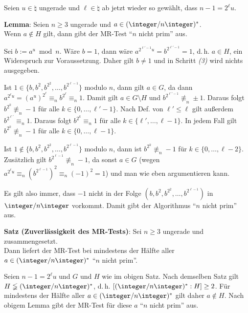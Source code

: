 \linie

Seien $u \in \natural$ ungerade und
$\ell \in \natural$ ab jetzt wieder so gewählt, dass $n-1 = 2^\ell u$.

\textbf{Lemma}:
Seien $n \ge 3$ ungerade und $a \in (\ZnZ)^\ast$.\\
Wenn $a \notin H$ gilt, dann gibt der MR-Test "`$n$ nicht prim"' aus.

\begin{Beweis}
    Sei $b := a^u \bmod n$.
    Wäre $b = 1$, dann wäre $a^{2^{\ell'-1} u} = b^{2^{\ell'-1}} = 1$,
    d.\,h. $a \in H$, ein Widerspruch zur Voraussetzung.
    Daher gilt $b \not= 1$ und in Schritt \emph{(3)} wird nichts ausgegeben.
    
    Ist $1 \in \{b, b^2, b^{2^2}, \dotsc, b^{2^{\ell-1}}\}$ modulo $n$,
    dann gilt $a \in G$,
    da dann $a^{2^\ell u} = (a^u)^{2^\ell} \equiv_n b^{2^\ell} \equiv_n 1$.
    Damit gilt $a \in G \setminus H$ und
    $b^{2^{\ell'-1}} \not\equiv_n \pm 1$.
    Daraus folgt $b^{2^k} \not\equiv_n -1$ für alle $k \in \{0, \dotsc, \ell' - 1\}$.
    Nach Def. von $\ell' \le \ell$ gilt außerdem $b^{2^{\ell'}} \equiv_n 1$.
    Daraus folgt $b^{2^k} \equiv_n 1$ für alle $k \in \{\ell', \dotsc, \ell - 1\}$.
    In jedem Fall gilt $b^{2^k} \not\equiv_n -1$ für alle $k \in \{0, \dotsc, \ell - 1\}$.
    
    Ist $1 \notin \{b, b^2, b^{2^2}, \dotsc, b^{2^{\ell-1}}\}$ modulo $n$,
    dann ist $b^{2^k} \not\equiv_n -1$ für $k \in \{0, \dotsc, \ell-2\}$.
    Zusätzlich gilt $b^{2^{\ell-1}} \not\equiv_n -1$,
    da sonst $a \in G$
    (wegen $a^{2^\ell u} \equiv_n (b^{2^{\ell-1}})^2 \equiv_n (-1)^2 = 1$)
    und man wie eben argumentieren kann.
    
    Es gilt also immer, dass $-1$ nicht in der Folge $(b, b^2, b^{2^2}, \dotsc, b^{2^{\ell-1}})$
    in $\ZnZ$ vorkommt.
    Damit gibt der Algorithmus "`$n$ nicht prim"' aus.
\end{Beweis}

\linie

\textbf{Satz (Zuverlässigkeit des MR-Tests)}:
Sei $n \ge 3$ ungerade und zusammengesetzt.\\
Dann liefert der MR-Test bei mindestens der Hälfte aller $a \in (\ZnZ)^\ast$
"`$n$ nicht prim"'.

\begin{Beweis}
    Seien $n-1 = 2^\ell u$ und $G$ und $H$ wie im obigen Satz.
    Nach demselben Satz gilt $H \lneqq (\ZnZ)^\ast$,
    d.\,h. $[(\ZnZ)^\ast : H] \ge 2$.
    Für mindestens der Hälfte aller $a \in (\ZnZ)^\ast$ gilt daher $a \notin H$.
    Nach obigem Lemma gibt der MR-Test für diese $a$ "`$n$ nicht prim"' aus.
\end{Beweis}

